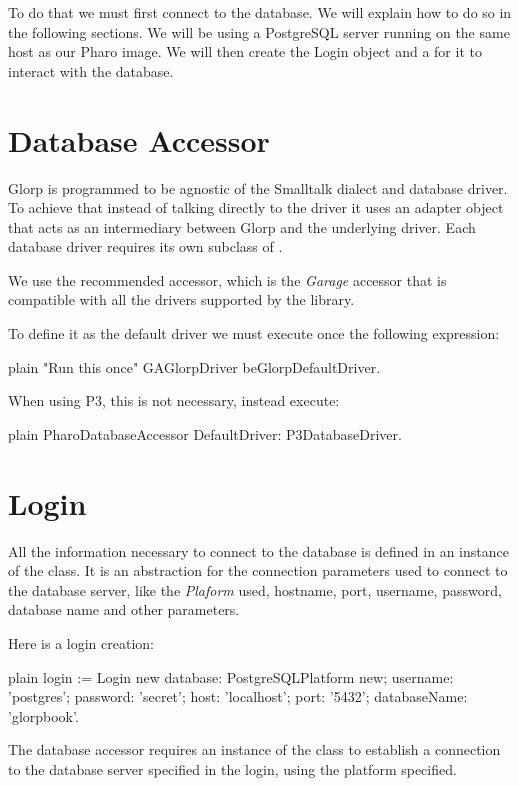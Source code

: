 \documentclass[10pt,twoside,english]{_support/latex/sbabook/sbabook}
\begin{document}
To do that we must first connect to the database. We will explain how to do so in the following sections.
We will be using a PostgreSQL server running on the same host as our Pharo image. We will then create the Login object and a	 for it to interact with the database.
\section{Database Accessor}
Glorp is programmed to be agnostic of the Smalltalk dialect and
database driver. To achieve that instead of talking directly to the
driver it uses an adapter object that acts as an intermediary between
Glorp and the underlying driver. Each database driver requires its
own subclass of .

We use the recommended accessor, which is the \textit{Garage} accessor
that is compatible with all the drivers supported by the library.

To define it as the default driver we must execute once the following expression:

\begin{displaycode}{plain}
"Run this once"
GAGlorpDriver beGlorpDefaultDriver.
\end{displaycode}

When using P3, this is not necessary, instead execute:

\begin{displaycode}{plain}
PharoDatabaseAccessor DefaultDriver: P3DatabaseDriver.
\end{displaycode}
\section{Login}
All the information necessary to connect to the database is defined in an instance of the
 class. It is an abstraction for the connection parameters
used to connect to the database server, like the \textit{Plaform} used,
hostname, port, username, password, database name and other parameters.

Here is a login creation: 

\begin{displaycode}{plain}
login := Login new
	database: PostgreSQLPlatform new;
	username: 'postgres';
	password: 'secret';
	host: 'localhost';
	port: '5432';
	databaseName: 'glorpbook'.
\end{displaycode}

The database accessor requires an instance of the class  to establish a connection
to the database server specified in the login, using the platform specified.
\end{document}
